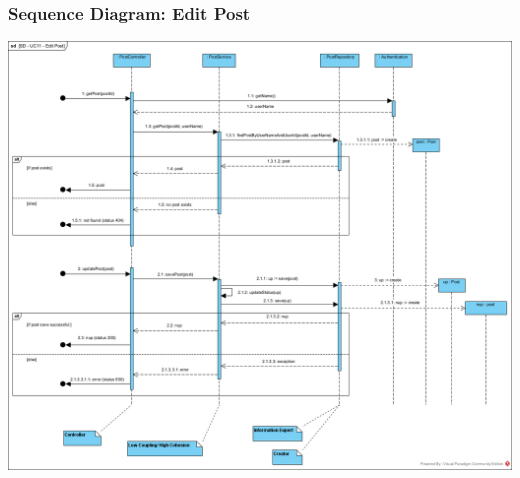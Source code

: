 \subsubsection{Sequence Diagram: Edit Post}
        \includegraphics[scale=0.5]{images/SD-UC11-EditPost.png}
        \label{fig:SD-EditPost}

